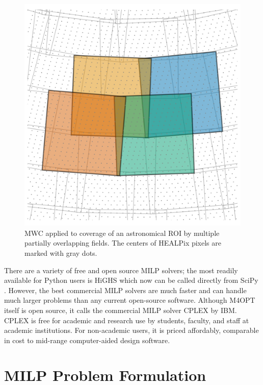 \documentclass[twocolumn,times]{aastex631}
\begin{document}
\begin{figure}
    \includegraphics[width=\columnwidth]{figures/overlapping-fields}
    \caption{\label{fig:overlapping-fields}\ac{MWC} applied to coverage of an astronomical \ac{ROI} by multiple partially overlapping fields. The centers of \ac{HEALPix} pixels are marked with gray dots.}
\end{figure}

There are a variety of free and open source \ac{MILP} solvers; the most readily available for Python users is HiGHS \citep{huangfu2018parallelizing} which now can be called directly from SciPy \citep{2020NatMe..17..261V}. However, the best commercial \ac{MILP} solvers are much faster and can handle much larger problems than any current open-source software. Although \ac{M4OPT} itself is open source, it calls the commercial \ac{MILP} solver CPLEX by IBM. CPLEX is free for academic and research use by students, faculty, and staff at academic institutions. For non-academic users, it is priced affordably, comparable in cost to mid-range computer-aided design software.

\section{MILP Problem Formulation}
\end{document}
